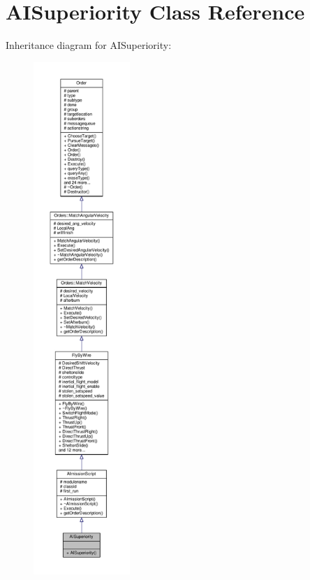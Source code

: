 \hypertarget{classAISuperiority}{}\section{A\+I\+Superiority Class Reference}
\label{classAISuperiority}


Inheritance diagram for A\+I\+Superiority\+:
\nopagebreak
\begin{figure}[H]
\begin{center}
\leavevmode
\includegraphics[height=550pt]{d8/db8/classAISuperiority__inherit__graph}
\end{center}
\end{figure}


